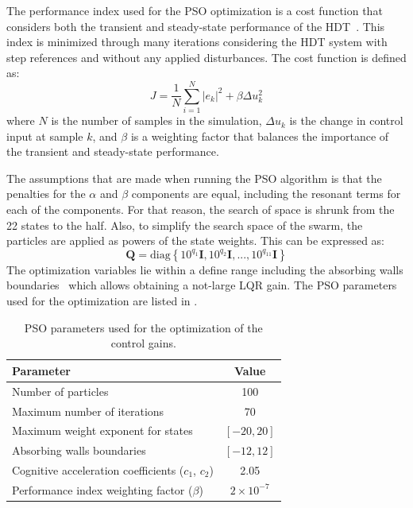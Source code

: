 The performance index used for the PSO optimization is a cost function that considers both the transient and steady-state performance of the HDT~\cite{ufnalskiParticleSwarmOptimization2015}. This index is minimized through many iterations considering the HDT system with step references and without any applied disturbances. The cost function is defined as:
\begin{equation}
    J = \dfrac{1}{N} \sum_{i=1}^{N} |e_k|^2 + \beta \Delta u_k^2
\end{equation}
where $N$ is the number of samples in the simulation, $\Delta u_k$ is the change in control input at sample $k$, and $\beta$ is a weighting factor that balances the importance of the transient and steady-state performance.

The assumptions that are made when running the PSO algorithm is that the penalties for the $\alpha$ and $\beta$ components are equal, including the resonant terms for each of the components. For that reason, the search of space is shrunk from the 22 states to the half. Also, to simplify the search space of the swarm, the particles are applied as powers of the state weights. This can be expressed as:
\begin{equation}
    \mathbf{Q} = \text{diag}\left\{10^{q_1}\mathbf{I}, 10^{q_2}\mathbf{I}, ..., 10^{q_{11}}\mathbf{I}\right\}
\end{equation}
The optimization variables lie within a define range including the absorbing walls boundaries~\cite{robinsonParticleSwarmOptimization2004} which allows obtaining a not-large LQR gain. The PSO parameters used for the optimization are listed in .

\begin{table}[t!]
    \centering
    \caption{PSO parameters used for the optimization of the control gains.}
    \label{tab:PSO_Parameters}
    \begin{tabular}{|l|c|}
        \hline
        \textbf{Parameter} & \textbf{Value}\\
        \hline\hline
        Number of particles & 100\\
        Maximum number of iterations & 70\\
        Maximum weight exponent for states & $[-20, 20]$\\
        Absorbing walls boundaries & $[-12, 12]$\\
        Cognitive acceleration coefficients ($c_1$, $c_2$) & 2.05\\
        Performance index weighting factor ($\beta$) & $2\times10^{-7}$\\
        \hline
    \end{tabular}
\end{table}

